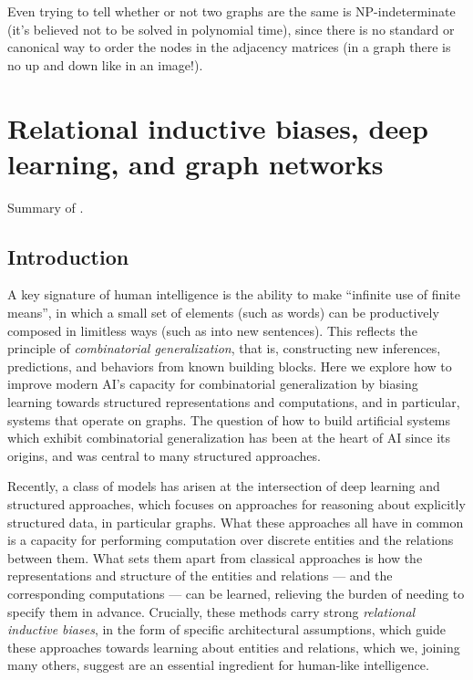 \documentclass[10pt]{book}
\let\defaultmarginpar\marginpar
\renewcommand\marginpar[2][]{\defaultmarginpar{\itshape\color{gray}#2}}
\begin{document}
Even trying to tell whether or not two graphs are the same is NP-indeterminate (it's believed not to be solved in polynomial time), since there is no standard or canonical way to order the nodes in the adjacency matrices (in a graph there is no up and down like in an image!).




\chapter{Relational inductive biases, deep learning, and graph networks}

Summary of \cite{battaglia2018relational}.

\section{Introduction}

A key signature of human intelligence is the ability to make ``infinite use of finite means'', in which a small set of elements (such as words) can be productively composed in limitless ways (such as into new sentences). This reflects the principle of \emph{combinatorial generalization}\marginpar{combinatorial generalization}, that is, constructing new inferences, predictions, and behaviors from known building blocks. Here we explore how to improve modern AI's capacity for combinatorial generalization by biasing learning towards structured representations and computations, and in particular, systems that operate on graphs. The question of how to build artificial systems which exhibit combinatorial generalization has been at the heart of AI since its origins, and was central to many structured approaches.

Recently, a class of models has arisen at the intersection of deep learning and structured approaches, which focuses on approaches for reasoning about explicitly structured data, in particular graphs. What these approaches all have in common is a capacity for performing computation over discrete entities and the relations between them. What sets them apart from classical approaches is how the representations and structure of the entities and relations --- and the corresponding computations --- can be learned, relieving the burden of needing to specify them in advance. Crucially, these methods carry strong \emph{relational inductive biases}, in the form of specific architectural assumptions, which guide these approaches towards learning about entities and relations, which we, joining many others, suggest are an essential ingredient for human-like intelligence.
\end{document}
